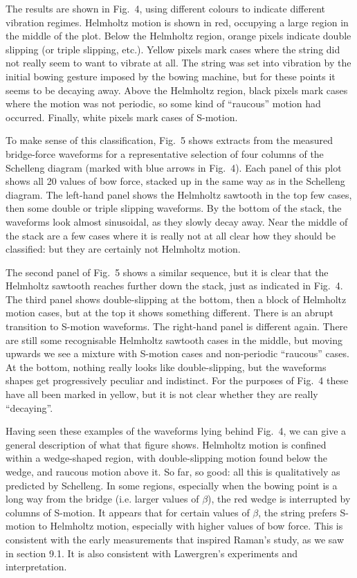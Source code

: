   The results are shown in Fig.\ 4, using different colours to indicate 
  different vibration regimes. Helmholtz motion is shown in red, occupying a 
  large region in the middle of the plot. Below the Helmholtz region, orange 
  pixels indicate double slipping (or triple slipping, etc.). Yellow pixels 
  mark cases where the string did not really seem to want to vibrate at all. 
  The string was set into vibration by the initial bowing gesture imposed by 
  the bowing machine, but for these points it seems to be decaying away. Above 
  the Helmholtz region, black pixels mark cases where the motion was not 
  periodic, so some kind of “raucous” motion had occurred. Finally, white 
  pixels mark cases of S-motion. 

  To make sense of this classification, Fig.\ 5 shows extracts from the 
  measured bridge-force waveforms for a representative selection of four 
  columns of the Schelleng diagram (marked with blue arrows in Fig.\ 4). Each 
  panel of this plot shows all 20 values of bow force, stacked up in the same 
  way as in the Schelleng diagram. The left-hand panel shows the Helmholtz 
  sawtooth in the top few cases, then some double or triple slipping waveforms. 
  By the bottom of the stack, the waveforms look almost sinusoidal, as they 
  slowly decay away. Near the middle of the stack are a few cases where it is 
  really not at all clear how they should be classified: but they are certainly 
  not Helmholtz motion. 

  The second panel of Fig.\ 5 shows a similar sequence, but it is clear that 
  the Helmholtz sawtooth reaches further down the stack, just as indicated in 
  Fig.\ 4. The third panel shows double-slipping at the bottom, then a block of 
  Helmholtz motion cases, but at the top it shows something different. There is 
  an abrupt transition to S-motion waveforms. The right-hand panel is different 
  again. There are still some recognisable Helmholtz sawtooth cases in the 
  middle, but moving upwards we see a mixture with S-motion cases and 
  non-periodic “raucous” cases. At the bottom, nothing really looks like 
  double-slipping, but the waveforms shapes get progressively peculiar and 
  indistinct. For the purposes of Fig.\ 4 these have all been marked in yellow, 
  but it is not clear whether they are really “decaying”. 

  Having seen these examples of the waveforms lying behind Fig.\ 4, we can give 
  a general description of what that figure shows. Helmholtz motion is confined 
  within a wedge-shaped region, with double-slipping motion found below the 
  wedge, and raucous motion above it. So far, so good: all this is 
  qualitatively as predicted by Schelleng. In some regions, especially when the 
  bowing point is a long way from the bridge (i.e. larger values of $\beta$), 
  the red wedge is interrupted by columns of S-motion. It appears that for 
  certain values of $\beta$, the string prefers S-motion to Helmholtz motion, 
  especially with higher values of bow force. This is consistent with the early 
  measurements that inspired Raman’s study, as we saw in section 9.1. It is 
  also consistent with Lawergren's experiments and interpretation. 

